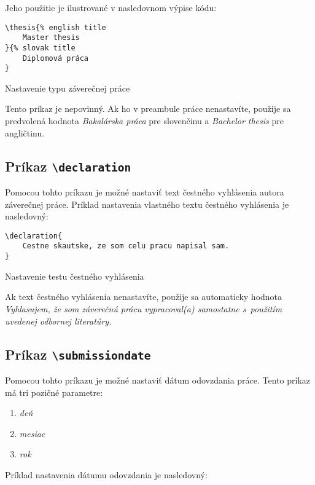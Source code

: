 Jeho použitie je ilustrované v nasledovnom výpise kódu:

\begin{listing}[ht!]
\begin{verbatim}
\thesis{% english title
    Master thesis
}{% slovak title
    Diplomová práca
}
\end{verbatim}
\caption{Nastavenie typu záverečnej práce}
\end{listing}

Tento príkaz je nepovinný. Ak ho v preambule práce nenastavíte, použije sa predvolená hodnota {\it Bakalárska práca} pre slovenčinu a {\it Bachelor thesis} pre angličtinu.


\subsection{Príkaz {\tt \textbackslash{}declaration}}

Pomocou tohto príkazu je možné nastaviť text čestného vyhlásenia autora záverečnej práce. Príklad nastavenia vlastného textu čestného vyhlásenia je nasledovný:

\begin{listing}[ht!]
\begin{verbatim}
\declaration{
    Cestne skautske, ze som celu pracu napisal sam.
}
\end{verbatim}
\caption{Nastavenie testu čestného vyhlásenia}
\end{listing}

Ak text čestného vyhlásenia nenastavíte, použije sa automaticky hodnota {\it Vyhlasujem, že som záverečnú prácu vypracoval(a) samostatne s~použitím uvedenej odbornej literatúry.}


\subsection{Príkaz {\tt \textbackslash{}submissiondate}}

Pomocou tohto príkazu je možné nastaviť dátum odovzdania práce. Tento príkaz má tri pozičné parametre:

\begin{enumerate}
    \item {\it deň}
    \item {\it mesiac}
    \item {\it rok}
\end{enumerate}

Príklad nastavenia dátumu odovzdania je nasledovný:


